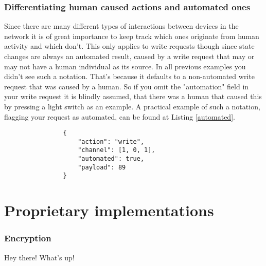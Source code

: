 \documentclass[11pt,a4paper, titlepage]{article}
\begin{document}
		\section[Automation]{Differentiating human caused actions and automated ones}
			Since there are many different types of interactions between devices in the network it is of great importance to keep track which ones originate from human activity and which don't. This only applies to write requests though since state changes are always an automated result, caused by a write request that may or may not have a human individual as its source. In all previous examples you didn't see such a notation. That's because it defaults to a non-automated write request that was caused by a human. So if you omit the "automation" field in your write request it is blindly assumed, that there was a human that caused this by pressing a light switch as an example. A practical example of such a notation, flagging your request as automated, can be found at Listing \ref{automated}.
			
			\begin{listing}
				\begin{verbatim}
				{
					"action": "write",
					"channel": [1, 0, 1],
					"automated": true,
					"payload": 89
				}
				\end{verbatim}
				\caption{Automated request}
				\label{automated}
			\end{listing}
		
	\part{Proprietary implementations}
		\section{Encryption}
			\label{sec:encryption}
			Hey there! What's up!
			\blindtext
		
		
\end{document}
